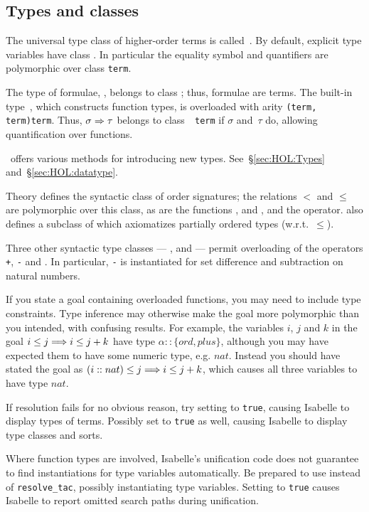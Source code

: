 \subsection{Types and classes}
The universal type class of higher-order terms is called~.
By default, explicit type variables have class .  In
particular the equality symbol and quantifiers are polymorphic over
class \texttt{term}.

The type of formulae, , belongs to class ; thus,
formulae are terms.  The built-in type~, which constructs
function types, is overloaded with arity {\tt(term,\thinspace
  term)\thinspace term}.  Thus, $\sigma\Rightarrow\tau$ belongs to class~{\tt
  term} if $\sigma$ and~$\tau$ do, allowing quantification over
functions.

\HOL\ offers various methods for introducing new types.
See~{\S}\ref{sec:HOL:Types} and~{\S}\ref{sec:HOL:datatype}.

Theory  defines the syntactic class  of order
signatures; the relations $<$ and $\leq$ are polymorphic over this
class, as are the functions ,  and , and
the  operator.  also defines a subclass
 of  which axiomatizes partially ordered types
(w.r.t.\ $\leq$).

Three other syntactic type classes --- ,  and
 --- permit overloading of the operators {\tt+}, {\tt-} and {\tt*}. In
particular, {\tt-} is instantiated for set difference and subtraction
on natural numbers.

If you state a goal containing overloaded functions, you may need to include
type constraints.  Type inference may otherwise make the goal more
polymorphic than you intended, with confusing results.  For example, the
variables $i$, $j$ and $k$ in the goal $i \leq j \Longrightarrow i \leq j+k$ have type
$\alpha::\{ord,plus\}$, although you may have expected them to have some
numeric type, e.g. $nat$.  Instead you should have stated the goal as
$(i::nat) \leq j \Longrightarrow i \leq j+k$, which causes all three variables to have
type $nat$.

\begin{warn}
  If resolution fails for no obvious reason, try setting
   to \texttt{true}, causing Isabelle to display
  types of terms.  Possibly set  to \texttt{true} as
  well, causing Isabelle to display type classes and sorts.

  Where function types are involved, Isabelle's unification code does not
  guarantee to find instantiations for type variables automatically.  Be
  prepared to use  instead of \texttt{resolve_tac},
  possibly instantiating type variables.  Setting
   to \texttt{true} causes Isabelle to report
  omitted search paths during unification.
\end{warn}


